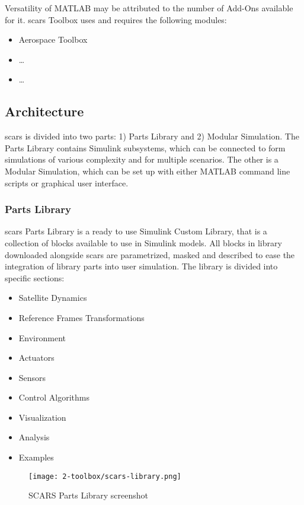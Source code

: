     Versatility of MATLAB may be attributed to the number of Add-Ons available for it. \ac{scars} Toolbox uses and requires the following modules:
    \begin{itemize}
        \item Aerospace Toolbox
        \item \dots
        \item \dots
    \end{itemize}
    

\subsection{Architecture}
    \ac{scars} is divided into two parts: 1) Parts Library and 2) Modular Simulation. The Parts Library contains Simulink subsystems, which can be connected to form simulations of various complexity and for multiple scenarios. The other is a Modular Simulation, which can be set up with either MATLAB command line scripts or graphical user interface.

    \subsubsection{Parts Library}
        \ac{scars} Parts Library is a ready to use Simulink Custom Library, that is a collection of blocks available to use in Simulink models. All blocks in library downloaded alongside \ac{scars} are parametrized, masked and described to ease the integration of library parts into user simulation. The library is divided into specific sections:
        \begin{itemize}
            \item Satellite Dynamics
            \item Reference Frames Transformations
            \item Environment
            \item Actuators
            \item Sensors
            \item Control Algorithms
            \item Visualization
            \item Analysis
            \item Examples
        \end{itemize}

        \begin{figure}[H]
            \centering
            \texttt{[image: 2-toolbox/scars-library.png]}
            \caption{SCARS Parts Library screenshot}
            \label{fig:scars-library}
        \end{figure}

